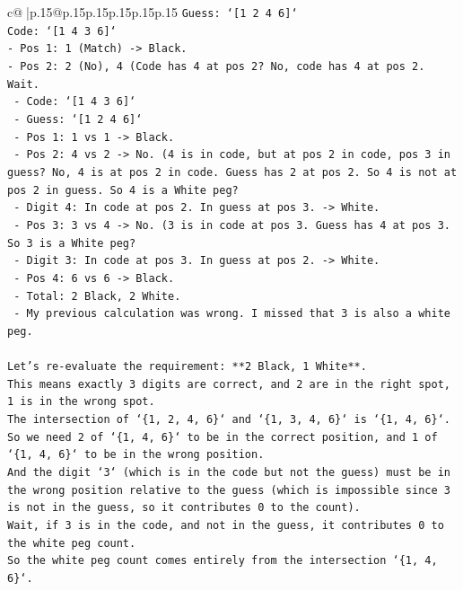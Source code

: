 \documentclass{article}
\begin{document}
{\begin{supertabular}{c@{$\;$}|p{.15\linewidth}@{}p{.15\linewidth}p{.15\linewidth}p{.15\linewidth}p{.15\linewidth}p{.15\linewidth}}
{{{\texttt{Guess: `{[}1 2 4 6{]}`} \\
\texttt{Code: `{[}1 4 3 6{]}`} \\
\texttt{{-} Pos 1: 1 (Match) {-}> Black.} \\
\texttt{{-} Pos 2: 2 (No), 4 (Code has 4 at pos 2? No, code has 4 at pos 2. Wait.} \\
\texttt{  {-} Code: `{[}1 4 3 6{]}`} \\
\texttt{  {-} Guess: `{[}1 2 4 6{]}`} \\
\texttt{  {-} Pos 1: 1 vs 1 {-}> Black.} \\
\texttt{  {-} Pos 2: 4 vs 2 {-}> No. (4 is in code, but at pos 2 in code, pos 3 in guess? No, 4 is at pos 2 in code. Guess has 2 at pos 2. So 4 is not at pos 2 in guess. So 4 is a White peg?} \\
\texttt{    {-} Digit 4: In code at pos 2. In guess at pos 3. {-}> White.} \\
\texttt{  {-} Pos 3: 3 vs 4 {-}> No. (3 is in code at pos 3. Guess has 4 at pos 3. So 3 is a White peg?} \\
\texttt{    {-} Digit 3: In code at pos 3. In guess at pos 2. {-}> White.} \\
\texttt{  {-} Pos 4: 6 vs 6 {-}> Black.} \\
\texttt{  {-} Total: 2 Black, 2 White.} \\
\texttt{  {-} My previous calculation was wrong. I missed that 3 is also a white peg.} \\
\\ 
\texttt{Let's re{-}evaluate the requirement: **2 Black, 1 White**.} \\
\texttt{This means exactly 3 digits are correct, and 2 are in the right spot, 1 is in the wrong spot.} \\
\texttt{The intersection of `\{1, 2, 4, 6\}` and `\{1, 3, 4, 6\}` is `\{1, 4, 6\}`.} \\
\texttt{So we need 2 of `\{1, 4, 6\}` to be in the correct position, and 1 of `\{1, 4, 6\}` to be in the wrong position.} \\
\texttt{And the digit `3` (which is in the code but not the guess) must be in the wrong position relative to the guess (which is impossible since 3 is not in the guess, so it contributes 0 to the count).} \\
\texttt{Wait, if 3 is in the code, and not in the guess, it contributes 0 to the white peg count.} \\
\texttt{So the white peg count comes entirely from the intersection `\{1, 4, 6\}`.} \\
}}}
\end{supertabular}}
\end{document}
